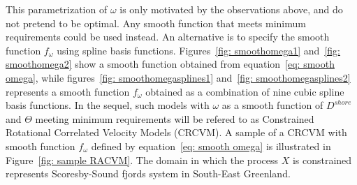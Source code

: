 \documentclass[11pt]{article}
\newcommand {\1}{\mathbb{1}}
\theoremstyle{definition}
\theoremstyle{remark}
\theoremstyle{remark}
\begin{document}
This parametrization of $\omega$ is only motivated by the observations above, and do not pretend to be optimal. Any smooth function that meets minimum requirements could be used instead. An alternative is to specify the smooth function $f_{\omega}$ using spline basis functions. Figures~\ref{fig: smoothomega1} and~\ref{fig: smoothomega2} show a smooth function obtained from equation~\ref{eq: smooth omega}, while figures~\ref{fig: smoothomegasplines1} and~\ref{fig: smoothomegasplines2}  represents a smooth function $f_{\omega}$ obtained as a combination of nine cubic spline basis functions. In the sequel, such models with $\omega$ as a smooth function of $D^{shore}$ and $\Theta$ meeting minimum requirements will be refered to as Constrained Rotational Correlated Velocity Models (CRCVM). A sample of a CRCVM with smooth function $f_{\omega}$ defined by equation~\ref{eq: smooth omega} is illustrated in Figure~\ref{fig: sample RACVM}. The domain in which the process $X$ is constrained represents Scoresby-Sound fjords system in South-East Greenland.
\end{document}
